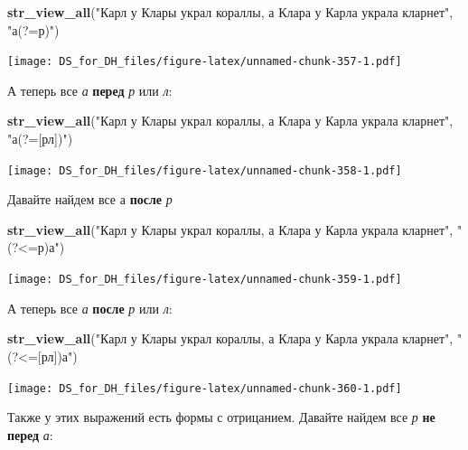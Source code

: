 \documentclass[
]{book}
\newenvironment{Shaded}{\begin{snugshade}}{\end{snugshade}}
\newcommand{\KeywordTok}[1]{\textcolor[rgb]{0.13,0.29,0.53}{\textbf{#1}}}
\newcommand{\NormalTok}[1]{#1}
\newcommand{\StringTok}[1]{\textcolor[rgb]{0.31,0.60,0.02}{#1}}
\begin{document}
\begin{Shaded}
\begin{Highlighting}[]
\KeywordTok{str_view_all}\NormalTok{(}\StringTok{"Карл у Клары украл кораллы, а Клара у Карла украла кларнет"}\NormalTok{, }\StringTok{"а(?=р)"}\NormalTok{)}
\end{Highlighting}
\end{Shaded}

\texttt{[image: DS\_for\_DH\_files/figure-latex/unnamed-chunk-357-1.pdf]}

А теперь все \emph{а} \textbf{перед} \emph{р} или \emph{л}:

\begin{Shaded}
\begin{Highlighting}[]
\KeywordTok{str_view_all}\NormalTok{(}\StringTok{"Карл у Клары украл кораллы, а Клара у Карла украла кларнет"}\NormalTok{, }\StringTok{"а(?=[рл])"}\NormalTok{)}
\end{Highlighting}
\end{Shaded}

\texttt{[image: DS\_for\_DH\_files/figure-latex/unnamed-chunk-358-1.pdf]}

Давайте найдем все а \textbf{после} \emph{р}

\begin{Shaded}
\begin{Highlighting}[]
\KeywordTok{str_view_all}\NormalTok{(}\StringTok{"Карл у Клары украл кораллы, а Клара у Карла украла кларнет"}\NormalTok{, }\StringTok{"(?<=р)а"}\NormalTok{)}
\end{Highlighting}
\end{Shaded}

\texttt{[image: DS\_for\_DH\_files/figure-latex/unnamed-chunk-359-1.pdf]}

А теперь все \emph{а} \textbf{после} \emph{р} или \emph{л}:

\begin{Shaded}
\begin{Highlighting}[]
\KeywordTok{str_view_all}\NormalTok{(}\StringTok{"Карл у Клары украл кораллы, а Клара у Карла украла кларнет"}\NormalTok{, }\StringTok{"(?<=[рл])а"}\NormalTok{)}
\end{Highlighting}
\end{Shaded}

\texttt{[image: DS\_for\_DH\_files/figure-latex/unnamed-chunk-360-1.pdf]}

Также у этих выражений есть формы с отрицанием. Давайте найдем все \emph{р} \textbf{не перед} \emph{а}:
\end{document}
